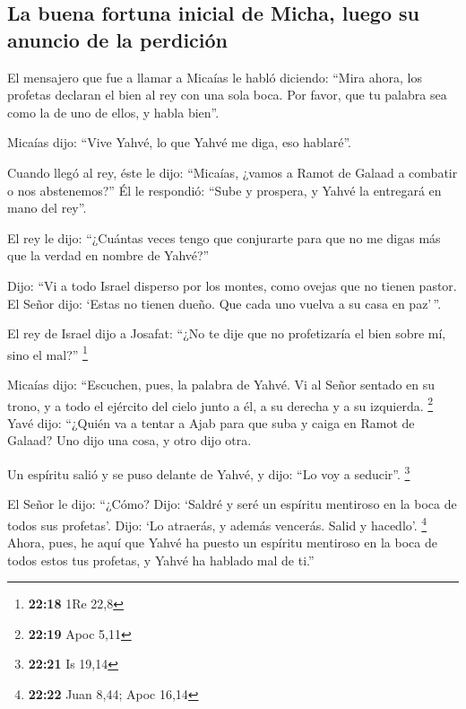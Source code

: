 \hypertarget{la-buena-fortuna-inicial-de-micha-luego-su-anuncio-de-la-perdiciuxf3n}{%
\subsection{La buena fortuna inicial de Micha, luego su anuncio de la
perdición}\label{la-buena-fortuna-inicial-de-micha-luego-su-anuncio-de-la-perdiciuxf3n}}

 El mensajero que fue a llamar a Micaías le habló
diciendo: ``Mira ahora, los profetas declaran el bien al rey con una
sola boca. Por favor, que tu palabra sea como la de uno de ellos, y
habla bien''.

 Micaías dijo: ``Vive Yahvé, lo que Yahvé me diga, eso
hablaré''.

 Cuando llegó al rey, éste le dijo: ``Micaías, ¿vamos a
Ramot de Galaad a combatir o nos abstenemos?'' Él le respondió: ``Sube y
prospera, y Yahvé la entregará en mano del rey''.

 El rey le dijo: ``¿Cuántas veces tengo que conjurarte
para que no me digas más que la verdad en nombre de Yahvé?''

 Dijo: ``Vi a todo Israel disperso por los montes, como
ovejas que no tienen pastor. El Señor dijo: `Estas no tienen dueño. Que
cada uno vuelva a su casa en paz'\,''.

 El rey de Israel dijo a Josafat: ``¿No te dije que no
profetizaría el bien sobre mí, sino el mal?'' \footnote{\textbf{22:18}
  1Re 22,8}

 Micaías dijo: ``Escuchen, pues, la palabra de Yahvé. Vi
al Señor sentado en su trono, y a todo el ejército del cielo junto a él,
a su derecha y a su izquierda. \footnote{\textbf{22:19} Apoc 5,11}
 Yavé dijo: ``¿Quién va a tentar a Ajab para que suba y
caiga en Ramot de Galaad? Uno dijo una cosa, y otro dijo otra.

 Un espíritu salió y se puso delante de Yahvé, y dijo:
``Lo voy a seducir''. \footnote{\textbf{22:21} Is 19,14}

 El Señor le dijo: ``¿Cómo? Dijo: `Saldré y seré un
espíritu mentiroso en la boca de todos sus profetas'. Dijo: `Lo
atraerás, y además vencerás. Salid y hacedlo'. \footnote{\textbf{22:22}
  Juan 8,44; Apoc 16,14}  Ahora, pues, he aquí que Yahvé
ha puesto un espíritu mentiroso en la boca de todos estos tus profetas,
y Yahvé ha hablado mal de ti.''

